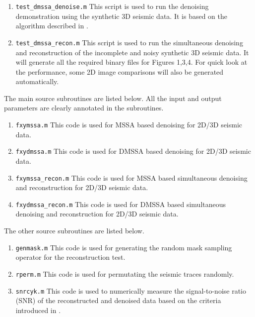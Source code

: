 \begin{enumerate}
\item \texttt{test\_dmssa\_denoise.m} This script is used to run the denoising demonstration using the synthetic 3D seismic data. It is based on the algorithm described in \cite{weilin2016}.
\item \texttt{test\_dmssa\_recon.m} This script is used to run the simultaneous denoising and reconstruction of the incomplete and noisy synthetic 3D seismic data. It will generate all the required binary files for Figures 1,3,4. For quick look at the performance, some 2D image comparisons will also be generated automatically.
\end{enumerate}

The main source subroutines are listed below. All the input and output parameters are clearly annotated in the subroutines.

\begin{enumerate}
\item \texttt{fxymssa.m} This code is used for MSSA based denoising for 2D/3D seismic data.

\item \texttt{fxydmssa.m} This code is used for DMSSA based denoising for 2D/3D seismic data.

\item \texttt{fxymssa\_recon.m} This code is used for MSSA based simultaneous denoising and reconstruction for 2D/3D seismic data.

\item \texttt{fxydmssa\_recon.m} This code is used for DMSSA based simultaneous denoising and reconstruction for 2D/3D seismic data.
\end{enumerate}

The other source subroutines are listed below.
\begin{enumerate}
\item \texttt{genmask.m} This code is used for generating the random mask sampling operator \cite[]{yangkang2015shape} for the reconstruction test.

\item \texttt{rperm.m} This code is used for permutating the seismic traces randomly.

\item \texttt{snrcyk.m} This code is used to numerically measure the signal-to-noise ratio (SNR) of the reconstructed and denoised data based on the criteria introduced in \cite{yangkang2015ortho}.
\end{enumerate}

